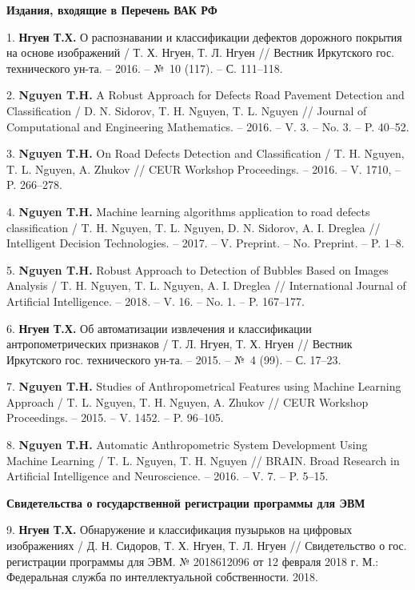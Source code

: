 \hspace{-1.5cm}\textbf{Издания, входящие в Перечень ВАК РФ}

1. \textbf{Нгуен Т.Х.} О распознавании и классификации дефектов дорожного покрытия на основе изображений / Т. Х. Нгуен, Т. Л. Нгуен // Вестник Иркутского гос. технического ун-та. -- 2016. -- №~10 (117). -- С. 111--118.

2. \textbf{Nguyen T.H.} A Robust Approach for Defects Road Pavement Detection and Classification / D. N. Sidorov, T. H. Nguyen, T. L. Nguyen // Journal of Computational and Engineering Mathematics. -- 2016. -- V. 3. -- No. 3. -- P. 40--52.

3. \textbf{Nguyen T.H.} On Road Defects Detection and Classification / T. H. Nguyen, T. L. Nguyen, A. Zhukov // CEUR Workshop Proceedings. -- 2016. -- V. 1710, -- P. 266--278.

4. \textbf{Nguyen T.H.} Machine learning algorithms application to road defects classification / T. H. Nguyen, T. L. Nguyen, D. N. Sidorov, A. I. Dreglea // Intelligent Decision Technologies. -- 2017. -- V. Preprint. -- No. Preprint. -- P. 1--8.

5. \textbf{Nguyen T.H.} Robust Approach to Detection of Bubbles Based on Images Analysis / T. H. Nguyen, T. L. Nguyen, A. I. Dreglea // International Journal of Artificial Intelligence. -- 2018. -- V. 16. -- No. 1. -- P. 167--177.

6. \textbf{Нгуен Т.Х.} Об автоматизации извлечения и классификации антропометрических признаков / Т. Л. Нгуен, Т. Х. Нгуен // Вестник Иркутского гос. технического ун-та. -- 2015. -- №~4 (99). -- С. 17--23.

7. \textbf{Nguyen T.H.} Studies of Anthropometrical Features using Machine Learning Approach / T. L. Nguyen, T. H. Nguyen, A. Zhukov // CEUR Workshop Proceedings. -- 2015. -- V. 1452. -- P. 96--105.

8. \textbf{Nguyen T.H.} Automatic Anthropometric System Development Using Machine Learning / T. L. Nguyen, T. H. Nguyen // BRAIN. Broad Research in Artificial Intelligence and Neuroscience. -- 2016. -- V. 7. -- P. 5--15.

 \newpage \hspace{-1.5cm}\textbf{Свидетельства о государственной регистрации программы для ЭВМ}

9. \textbf{Нгуен Т.Х.} Обнаружение и классификация пузырьков на цифровых изображениях / Д. Н. Сидоров, Т. Х. Нгуен, Т. Л. Нгуен // Свидетельство о гос. регистрации программы для ЭВМ. № 2018612096 от 12 февраля 2018 г. М.: Федеральная служба по интеллектуальной собственности. 2018.

